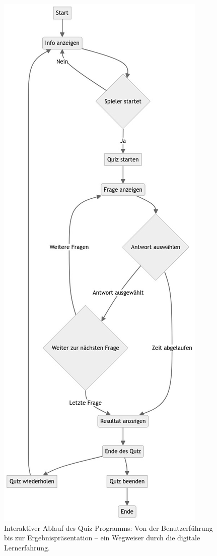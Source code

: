 \documentclass[10pt, fleqn]{scrartcl}
\begin{document}
\begin{figure}[h!]
	\centering
	\includegraphics[scale=0.4]{flowcharts/flowchart1.png}
	\caption{Interaktiver Ablauf des Quiz-Programms: Von der Benutzerführung bis zur Ergebnispräsentation – ein Wegweiser durch die digitale Lernerfahrung.}
	\label{fig:main-logic}
\end{figure}
\end{document}
